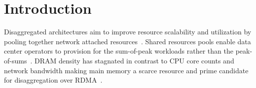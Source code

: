 \section{Introduction}
\label{sec:intro}




Disaggregated architectures aim to improve resource scalability and utilization by pooling together
network attached resources~\cite{dredbox,firebox,blade-server,legoos}. Shared resources pools enable
data center operators to provision for the sum-of-peak workloads rather than the
peak-of-sums~\cite{dsnf,supernic}. DRAM density has stagnated in contrast to CPU core counts and
network bandwidth making main memory a scarce resource and prime candidate for disaggregation over
RDMA~\cite{fastswap,3po,kona,infiniswap,hydra,leap,legoos,dilos}.

